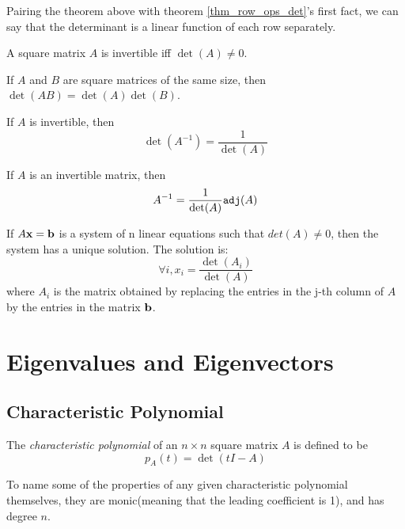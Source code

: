 \documentclass{report}
\begin{document}
			Pairing the theorem above with theorem \ref{thm_row_ops_det}'s first fact, we can say that the determinant is a linear function of each row separately.
			
			\begin{thm}
				A square matrix $A$ is invertible iff $\det(A) \ne 0$.
			\end{thm}
			
			\begin{thm}
				If $A$ and $B$ are square matrices of the same size, then $\det(AB)=\det(A)\det(B)$.
			\end{thm}
			
			\begin{thm}
				If $A$ is invertible, then
				\begin{displaymath}
					\det(A^{-1})=\frac{1}{\det(A)}
				\end{displaymath}
			\end{thm}
			
			\begin{thm}
				If $A$ is an invertible matrix, then
				\begin{displaymath}
					A^{-1}=\frac{1}{\det(A)}\verb|adj|(A)
				\end{displaymath}
			\end{thm}
			
			\begin{thm}
				If $A\bf{x}=\bf{b}$ is a system of n linear equations such that $det(A)\ne0$, then the system has a unique solution. The solution is:
				\begin{displaymath}
					\forall i, x_i=\frac{\det(A_i)}{\det(A)}
				\end{displaymath}
				where $A_i$ is the matrix obtained by replacing the entries in the j-th column of $A$ by the entries in the matrix $\bf{b}$.
			\end{thm}
		
	\section{Eigenvalues and Eigenvectors}
		\subsection{Characteristic Polynomial}
			\begin{defn}\label{def_characteristic_polynomial}
				The \emph{characteristic polynomial} of an $n \times n$ square matrix $A$ is defined to be
				\begin{displaymath}
					p_A(t)=\det(tI-A)
				\end{displaymath}
			\end{defn}
			To name some of the properties of any given characteristic polynomial themselves, they are monic(meaning that the leading coefficient is 1), and has degree $n$.
			
\end{document}
